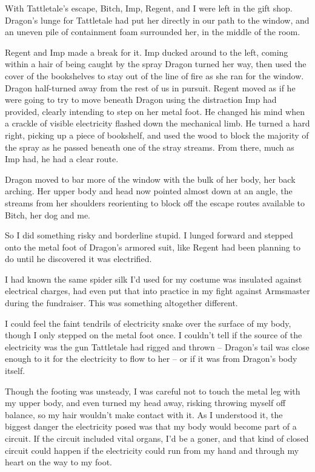 With Tattletale's escape, Bitch, Imp, Regent, and I were left in the gift shop.  Dragon's lunge for Tattletale had put her directly in our path to the window, and an uneven pile of containment foam surrounded her, in the middle of the room.



Regent and Imp made a break for it.  Imp ducked around to the left, coming within a hair of being caught by the spray Dragon turned her way, then used the cover of the bookshelves to stay out of the line of fire as she ran for the window.  Dragon half-turned away from the rest of us in pursuit.  Regent moved as if he were going to try to move beneath Dragon using the distraction Imp had provided, clearly intending to step on her metal foot.  He changed his mind when a crackle of visible electricity flashed down the mechanical limb.  He turned a hard right, picking up a piece of bookshelf, and used the wood to block the majority of the spray as he passed beneath one of the stray streams.  From there, much as Imp had, he had a clear route.



Dragon moved to bar more of the window with the bulk of her body, her back arching.  Her upper body and head now pointed almost down at an angle, the streams from her shoulders reorienting to block off the escape routes available to Bitch, her dog and me.



So I did something risky and borderline stupid.  I lunged forward and stepped onto the metal foot of Dragon's armored suit, like Regent had been planning to do until he discovered it was electrified.



I had known the same spider silk I'd used for my costume was insulated against electrical charges, had even put that into practice in my fight against Armsmaster during the fundraiser.  This was something altogether different.



I could feel the faint tendrils of electricity snake over the surface of my body, though I only stepped on the metal foot once.  I couldn't tell if the source of the electricity was the gun Tattletale had rigged and thrown – Dragon's tail was close enough to it for the electricity to flow to her – or if it was from Dragon's body itself.



Though the footing was unsteady, I was careful not to touch the metal leg with my upper body, and even turned my head away, risking throwing myself off balance, so my hair wouldn't make contact with it.  As I understood it, the biggest danger the electricity posed was that my body would become part of a circuit.  If the circuit included vital organs, I'd be a goner, and that kind of closed circuit could happen if the electricity could run from my hand and through my heart on the way to my foot.



